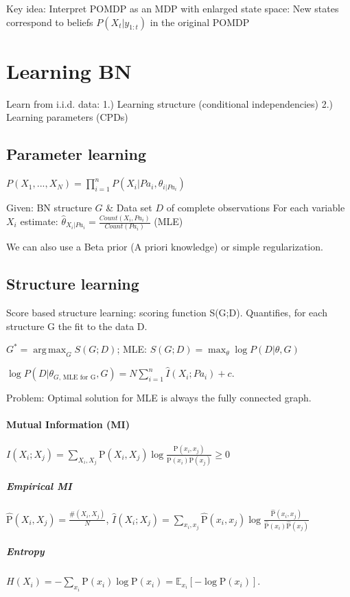 \documentclass[a4paper, 10pt]{scrartcl}
\DeclareMathOperator*{\argmax}{arg\,max}
\newcommand{\uP}{\mathrm P}
\begin{document}
\begin{multicols*}{3}
Key idea: Interpret POMDP as an MDP with enlarged state space: New states correspond to beliefs $P(X_t | y_{1:t})$ in the original POMDP

\section{Learning BN}
Learn from i.i.d. data: 1.) Learning structure (conditional independencies) 2.) Learning parameters (CPDs)

\subsection{Parameter learning}
$P(X_1, ..., X_N) = \prod_{i=1}^{n} P(X_i | Pa_i, {\theta}_{i | Pa_i})$

Given:  BN structure $G$ \& Data set $D$ of complete observations
For each variable $X_i$ estimate: $\hat{\theta}_{X_i | Pa_i} = \frac{Count(X_i , Pa_i)}{Count(Pa_i)}$ (MLE)

We can also use a Beta prior (A priori knowledge) or simple regularization.

\subsection{Structure learning}
Score based structure learning: scoring function S(G;D). Quantifies, for each structure G the fit to the data D. 

$G^* = \argmax_G S(G;D)$; MLE: $S(G;D) = \max_\theta \log P(D | \theta, G)$

$\log P(D | \theta_{G \text{, MLE for G}}, G) = N \sum_{i=1}^{n} \hat{I}(X_i; Pa_i) + c$.

Problem: Optimal solution for MLE is always the fully  connected graph. 

\paragraph{Mutual Information (MI)}
$I(X_i; X_j) = \sum_{X_i, X_j} \uP(X_i, X_j) \log \frac{\uP(x_i, x_j)}{\uP(x_i) \uP(x_j)} \geq 0$

\subparagraph{Empirical MI}
$\hat{\uP}(X_i, X_j) = \frac{\#(X_i, X_j)}{N}$, $\hat I(X_i; X_j) = \sum_{x_i, x_j} \hat{\uP}(x_i, x_j) \log \frac{\hat{\uP}(x_i, x_j)}{\hat{\uP}(x_i) \hat{\uP}(x_j)}$

\subparagraph{Entropy}
$H(X_i) = -\sum_{x_i}\uP(x_i)\log\uP(x_i) = \mathbb{E}_{x_i}[-\log\uP(x_i)]$.


\end{multicols*}
\end{document}
